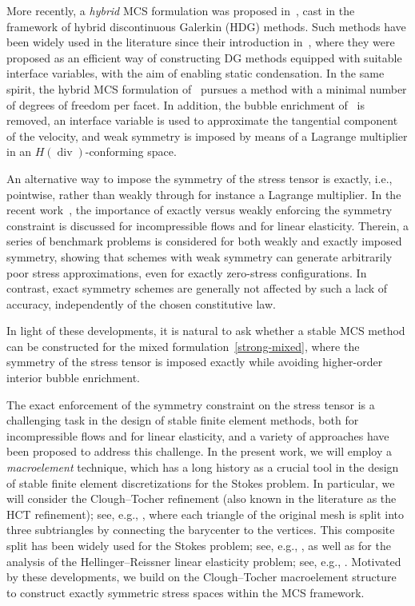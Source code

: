 \documentclass[a4paper,twoside,10pt]{article}
\theoremstyle{plain}
\theoremstyle{remark}
\theoremstyle{definition}
\numberwithin{equation}{section}
\numberwithin{figure}{section}
\DeclareMathOperator{\dive}{div}
\begin{document}
More recently,
a \emph{hybrid} MCS formulation was proposed in~\cite{Gopalakrishnan-Kogler-Lederer-Schoberl:2023},
cast in the framework of hybrid discontinuous Galerkin (HDG) methods.
Such methods have been widely used in the literature
since their introduction in~\cite{Cockburn-Gopalakrishnan-Lazarov:2009},
where they were proposed as an efficient way of constructing
DG methods equipped with suitable interface variables,
with the aim of enabling static condensation.
In the same spirit,
the hybrid MCS formulation of~\cite{Gopalakrishnan-Kogler-Lederer-Schoberl:2023}
pursues a method with a minimal number of degrees of freedom per facet.
In addition,
the bubble enrichment of~\cite{Gopalakrishnan-Lederer-Schoberl:2020-b} is removed,
an interface variable is used to approximate the tangential component of the velocity,
and weak symmetry is imposed by means of a Lagrange multiplier in an $H(\dive)$-conforming space.

An alternative way to impose the symmetry of the stress tensor is exactly, i.e., pointwise,
rather than weakly through for instance a Lagrange multiplier.
In the recent work~\cite{Brubeck-Parker-Zerbinati:2026},
the importance of exactly versus weakly enforcing the symmetry constraint is discussed for incompressible flows and for linear elasticity.
Therein,
a series of benchmark problems is considered for both
weakly and exactly imposed symmetry,
showing that schemes with weak symmetry
can generate arbitrarily poor stress approximations,
even for exactly zero-stress configurations.
In contrast,
exact symmetry schemes are generally not affected by such a lack of accuracy,
independently of the chosen constitutive law.

In light of these developments,
it is natural to ask whether a stable MCS method can be constructed
for the mixed formulation~\eqref{strong-mixed},
where the symmetry of the stress tensor is imposed exactly
while avoiding higher-order interior bubble enrichment.

The exact enforcement of the symmetry constraint on the stress tensor is a challenging task
in the design of stable finite element methods,
both for incompressible flows and for linear elasticity,
and a variety of approaches have been proposed to address this challenge.
In the present work,
we will employ a \emph{macroelement} technique,
which has a long history as a crucial tool in the design
of stable finite element discretizations for the Stokes problem.
In particular,
we will consider the Clough--Tocher refinement
(also known in the literature as the HCT refinement);
see, e.g., \cite{Clough-Tocher:1965,Ciarlet:1991},
where each triangle of the original mesh is split into three subtriangles
by connecting the barycenter to the vertices.
This composite split has been widely used for the Stokes problem;
see, e.g., \cite{Qin:1994,Zhang:2005,Arnold-Qin:1992},
as well as for the analysis of the Hellinger--Reissner linear elasticity problem;
see, e.g., \cite{Watwood-Hartz:1968,Johnson-Mercier:1979}.
Motivated by these developments,
we build on the Clough--Tocher macroelement structure
to construct exactly symmetric stress spaces within the MCS framework.
\end{document}
